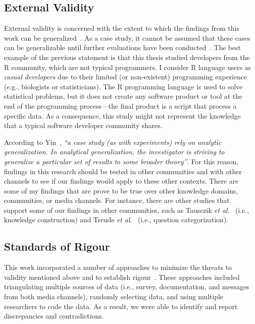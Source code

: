 \documentclass{sig-alternate-05-2015}
\begin{document}
\subsection{External Validity}

	External validity is concerned with the extent to which the findings from this work can be generalized~\cite{Runeson2012, Calder1982}. 
	As a case study, it cannot be assumed that these cases can be generalizable until further evaluations have been conducted~\cite{Yin2009}.
	The best example of the previous statement is that this thesis studied developers from the R community, which are not typical programmers.
	I consider R language users as \textit{casual developers} due to their limited (or non-existent) programming experience (e.g., biologists or statisticians).
	The R programming language is used to solve statistical problems, but it does not create any software product or tool at the end of the programming process---the final product is a script that process a specific data.
	As a consequence, this study might not represent the knowledge that a typical software developer community shares.

	According to Yin~\cite{Yin2009}, \textit{``a case study (as with experiments) rely on analytic generalization. In analytical generalization, the investigator is striving to generalize a particular set of results to some broader theory''}. 
	For this reason, findings in this research should be tested in other communities and with other channels to see if our findings would apply to these other contexts.
	There are some of my findings that are prove to be true over other knowledge domains, communities, or media channels. 
	For instance, there are other studies that support some of our findings in other communities, such as Tausczik \textit{et al.}~\cite{Tausczik2014} (i.e., knowledge construction) and Treude \textit{et al.}~\cite{Treude2011} (i.e., question categorization).

\subsection{Standards of Rigour}
	This work incorporated a number of approaches to minimize the threats to validity mentioned above and to establish rigour~\cite{Runeson2012,Yin2009}.	
	These approaches included triangulating multiple sources of data (i.e., survey, documentation, and messages from both media channels), randomly selecting data, and using multiple researchers to code the data. 
	As a result, we were able to identify and report discrepancies and contradictions.
\end{document}

